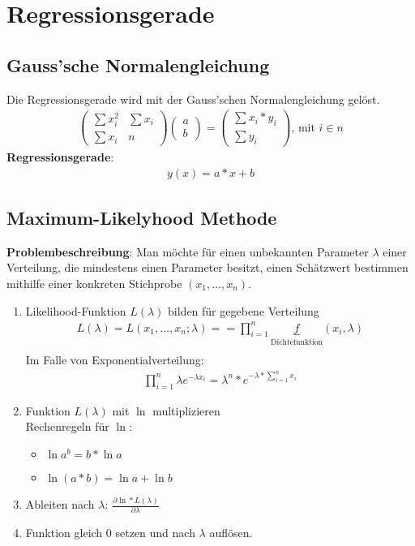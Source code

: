 \documentclass{article}
\begin{document}
\section{Regressionsgerade}
\subsection{Gauss'sche Normalengleichung}
Die Regressionsgerade wird mit der Gauss'schen Normalengleichung gel\"ost.
\begin{align}
	\begin{pmatrix}
		\sum x_i^2 & \sum x_i \\
		\sum x_i   & n
	\end{pmatrix}
	\begin{pmatrix}
		a \\
		b
	\end{pmatrix}
	=
	\begin{pmatrix}
		\sum x_i*y_i \\
		\sum y_i
	\end{pmatrix} \text{, mit $i \in n$}
\end{align}
\textbf{Regressionsgerade}:
\begin{align}
	y(x) = a*x + b
\end{align}

\subsection{Maximum-Likelyhood Methode}
\textbf{Problembeschreibung}: Man m\"ochte f\"ur einen unbekannten Parameter $\lambda$
einer Verteilung, die mindestens einen Parameter besitzt, einen Sch\"atzwert bestimmen
mithilfe einer konkreten Stichprobe $(x_1, \ldots, x_n)$.

\begin{enumerate}
	\item Likelihood-Funktion $L(\lambda)$ bilden f\"ur gegebene Verteilung
		\begin{align}
			L(\lambda) = L(x_1, \ldots, x_n; \lambda) = = \prod_{i=1}^n
			\underbrace{f}_{\text{Dichtefunktion}}(x_i, \lambda)\\
		\end{align}
		Im Falle von Exponentialverteilung:\\
		\begin{align}
			\prod_{i=1}^n \lambda e^{-\lambda x_i} = \lambda^n * e^{-\lambda * \sum_{i=1}^{n}x_i}
		\end{align}
	\item Funktion $L(\lambda)$ mit $\ln$ multiplizieren\\
		Rechenregeln f\"ur $\ln$:
		\begin{itemize}
			\item $\ln a^b = b * \ln a$
			\item $\ln (a*b) = \ln a + \ln b$
		\end{itemize}
	\item Ableiten nach $\lambda$: $\frac{\partial \ln * L(\lambda)}{\partial \lambda}$
	\item Funktion gleich $0$ setzen und nach $\lambda$ aufl\"osen.
\end{enumerate}
\end{document}
